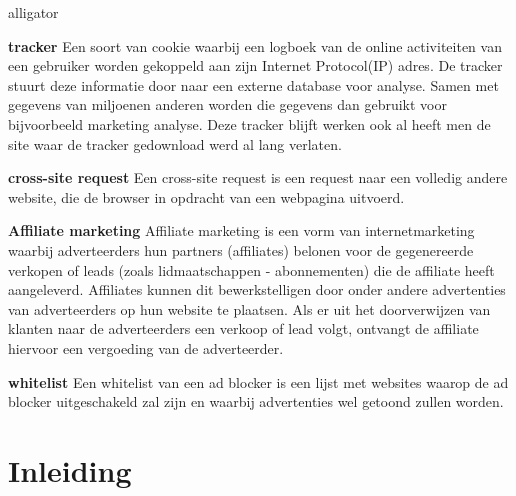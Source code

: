 \documentclass[pdftex,a4paper,12pt,twoside]{report}
\begin{document}
\newpage 
\begin{labeling}{alligator}
\item [\textbf{tracker}] Een soort van cookie waarbij een logboek van de online activiteiten van een gebruiker worden gekoppeld aan zijn Internet Protocol(IP) adres. De tracker stuurt deze informatie door naar een externe database voor analyse. Samen met gegevens van miljoenen anderen worden die gegevens dan gebruikt voor bijvoorbeeld marketing analyse. Deze tracker blijft werken ook al heeft men de site waar de tracker gedownload werd  al lang verlaten.

\item [\textbf{cross-site request}] Een cross-site request is een request naar een volledig andere website, die de browser in opdracht van een webpagina uitvoerd.
\item [\textbf{Affiliate marketing}] Affiliate marketing is een vorm van internetmarketing waarbij adverteerders hun partners (affiliates) belonen voor de gegenereerde verkopen of leads (zoals lidmaatschappen - abonnementen) die de affiliate heeft aangeleverd. Affiliates kunnen dit bewerkstelligen door onder andere advertenties van adverteerders op hun website te plaatsen. Als er uit het doorverwijzen van klanten naar de adverteerders een verkoop of lead volgt, ontvangt de affiliate hiervoor een vergoeding van de adverteerder.

\item [\textbf{whitelist}] Een whitelist van een ad blocker is een lijst met websites waarop de ad blocker uitgeschakeld zal zijn en waarbij advertenties wel getoond zullen worden.
\end{labeling}


\chapter{Inleiding}
\label{ch:inleiding}
\end{document}
